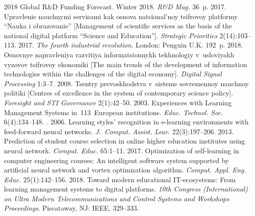 \begin{multicols}{2}
{\small\frenchspacing
 {%
 \begin{thebibliography}{99}
2018 Global R\&D Funding Forecast. 
Winter 2018. \textit{R\&D Mag.} 36~p.
 2017. 
Upravlenie nauchnymi servisami kak osnova na\-tsi\-onal'\-noy tsifrovoy platformy 
``Nauka i obrazovanie'' [Management of scientific services as the basis 
of the national digital platform ``Science and Education'']. 
\textit{Strategic Priorities} 2(14):103--113.
 2017. \textit{The fourth industrial revolution}. 
London: Penguin U.K. 192~p.
2018. Osnovnye napravleniya razvitiya informatsionnykh tekhnologiy 
v~usloviyakh vyzovov tsifrovoy ekonomiki [The main trends of the development 
of information technologies within the challenges of the digital economy]. 
\textit{Digital Signal Processing} 1:3--7.
 2008. Tsentry prevoskhodstva v~sisteme sovremennoy nauchnoy 
politiki [Centres of excellence in the system of contemporary science policy]. 
\textit{Foresight and STI Governance} 2(1):42--50.
 2003. Experiences with 
Learning Management Systems in~113~European institutions. 
\textit{Educ. Technol. Soc.} 6(4):134--148.
. 2006. Learning 
styles' recognition in e-learning environments with feed-forward neural networks. 
\textit{J.~Comput. Assist. Lear.} 22(3):197--206.
 2013. Prediction of student course selection in online higher education 
 institutes using neural network. \textit{Comput. Educ.} 65:1--11.
 2017. Optimization of self-learning in computer 
engineering courses: An intelligent software system supported by artificial neural 
network and vortex optimization algorithm. \textit{Comput. Appl. 
Eng. Educ.} 25(1):142--156.
 2018. Toward modern educational IT-ecosystems: 
From learning management systems to digital platforms. 
\textit{10th Congress (International)
on Ultra Modern Telecommunications and
Control Systems and Workshops Proceedings}.
Piscataway, NJ: IEEE. 329--333.

\end{thebibliography}}}
\end{multicols}
